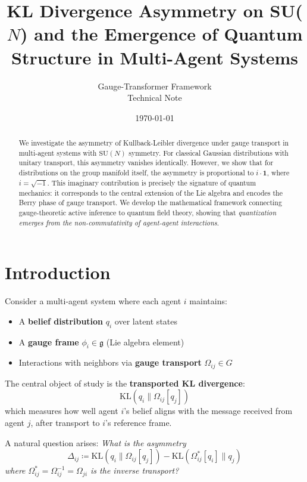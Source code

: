 \documentclass[11pt,a4paper]{article}
\title{\textbf{KL Divergence Asymmetry on SU($N$) and the Emergence of Quantum Structure in Multi-Agent Systems}}
\author{Gauge-Transformer Framework\\[1ex]
\small Technical Note}
\date{\today}
\newcommand{\KL}{\mathrm{KL}}
\newcommand{\SUN}{\mathrm{SU}(N)}
\newcommand{\id}{\mathbf{1}}
\begin{document}
\maketitle

\begin{abstract}
We investigate the asymmetry of Kullback-Leibler divergence under gauge transport in multi-agent systems with $\SUN$ symmetry. For classical Gaussian distributions with unitary transport, this asymmetry vanishes identically. However, we show that for distributions on the group manifold itself, the asymmetry is proportional to $i \cdot \id$, where $i = \sqrt{-1}$. This imaginary contribution is precisely the signature of quantum mechanics: it corresponds to the central extension of the Lie algebra and encodes the Berry phase of gauge transport. We develop the mathematical framework connecting gauge-theoretic active inference to quantum field theory, showing that \emph{quantization emerges from the non-commutativity of agent-agent interactions}.
\end{abstract}

\tableofcontents

\newpage

\section{Introduction}

Consider a multi-agent system where each agent $i$ maintains:
\begin{itemize}
    \item A \textbf{belief distribution} $q_i$ over latent states
    \item A \textbf{gauge frame} $\phi_i \in \mathfrak{g}$ (Lie algebra element)
    \item Interactions with neighbors via \textbf{gauge transport} $\Omega_{ij} \in G$
\end{itemize}

The central object of study is the \textbf{transported KL divergence}:
\begin{equation}
    \KL(q_i \| \Omega_{ij}[q_j])
\end{equation}
which measures how well agent $i$'s belief aligns with the message received from agent $j$, after transport to $i$'s reference frame.

A natural question arises: \emph{What is the asymmetry}
\begin{equation}
    \Delta_{ij} \coloneqq \KL(q_i \| \Omega_{ij}[q_j]) - \KL(\Omega_{ij}^*[q_i] \| q_j)
\end{equation}
\emph{where $\Omega_{ij}^* = \Omega_{ij}^{-1} = \Omega_{ji}$ is the inverse transport?}
\end{document}
